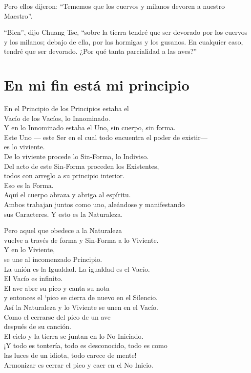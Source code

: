 \documentclass[hidelinks]{memoir}
\begin{document}
	Pero ellos dijeron: ``Tememos que los cuervos y milanos devoren a
	nuestro Maestro''.
	
	``Bien'', dijo Chuang Tse, ``sobre la tierra tendré que ser devorado por
	los cuervos y los milanos; debajo de ella, por las hormigas y los
	gusanos. En cualquier caso, tendré que ser devorado. ¿Por qué tanta
	parcialidad a las aves?''
	
	\chapter*{En mi fin está mi principio}
	
	En el Principio de los Principios estaba el\\
	Vacío de los Vacíos, lo Innominado.\\
	Y en lo Innominado estaba el Uno, sin cuerpo, sin forma.\\
	Este Uno --- este Ser en el cual todo encuentra el poder de existir---\\
	es lo viviente.\\
	De lo viviente procede lo Sin-Forma, lo Indiviso.\\
	Del acto de este Sin-Forma proceden los Existentes,\\
	todos con arreglo a su principio interior.\\
	Eso es la Forma.\\
	Aquí el cuerpo abraza y abriga al espíritu.\\
	Ambos trabajan juntos como uno, aleándose y manifestando\\
	sus Caracteres. Y esto es la Naturaleza.
	
	Pero aquel que obedece a la Naturaleza\\
	vuelve a través de forma y Sin-Forma a lo Viviente.\\
	Y en lo Viviente,\\
	se une al incomenzado Principio.\\
	La unión es la Igualdad. La igualdad es el Vacío.\\
	El Vacío es infinito.\\
	El ave abre su pico y canta su nota\\
	y entonces el `pico se cierra de nuevo en el Silencio.\\
	Así la Naturaleza y lo Viviente se unen en el Vacío.\\
	Como el cerrarse del pico de un ave\\
	después de su canción.\\
	El cielo y la tierra se juntan en lo No Iniciado.\\
	¡Y todo es tontería, todo es desconocido, todo es como\\
	las luces de un idiota, todo carece de mente!\\
	Armonizar es cerrar el pico y caer en el No Inicio.
	
\end{document}
